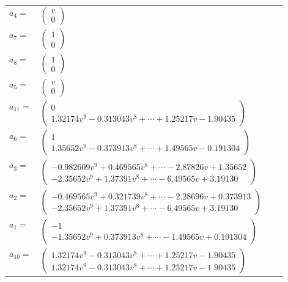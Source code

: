 \documentclass[1p]{elsarticle_modified}
\theoremstyle{definition}
\begin{document}
\begin{tabular}{m{7pt} m{180pt} m{7pt} m{180pt} }
\flushright $a_{4}=$&$\begin{pmatrix}v\\0\end{pmatrix}$ \\
\flushright $a_{7}=$&$\begin{pmatrix}1\\0\end{pmatrix}$ \\
\flushright $a_{8}=$&$\begin{pmatrix}1\\0\end{pmatrix}$ \\
\flushright $a_{5}=$&$\begin{pmatrix}v\\0\end{pmatrix}$ \\
\flushright $a_{11}=$&$\begin{pmatrix}0\\1.32174 v^{9}-0.313043 v^{8}+\cdots+1.25217 v-1.90435\end{pmatrix}$ \\
\flushright $a_{6}=$&$\begin{pmatrix}1\\1.35652 v^{9}-0.373913 v^{8}+\cdots+1.49565 v-0.191304\end{pmatrix}$ \\
\flushright $a_{3}=$&$\begin{pmatrix}-0.982609 v^{9}+0.469565 v^{8}+\cdots-2.87826 v+1.35652\\-2.35652 v^{9}+1.37391 v^{8}+\cdots-6.49565 v+3.19130\end{pmatrix}$ \\
\flushright $a_{2}=$&$\begin{pmatrix}-0.469565 v^{9}+0.321739 v^{8}+\cdots-2.28696 v+0.373913\\-2.35652 v^{9}+1.37391 v^{8}+\cdots-6.49565 v+3.19130\end{pmatrix}$ \\
\flushright $a_{1}=$&$\begin{pmatrix}-1\\-1.35652 v^{9}+0.373913 v^{8}+\cdots-1.49565 v+0.191304\end{pmatrix}$ \\
\flushright $a_{10}=$&$\begin{pmatrix}1.32174 v^{9}-0.313043 v^{8}+\cdots+1.25217 v-1.90435\\1.32174 v^{9}-0.313043 v^{8}+\cdots+1.25217 v-1.90435\end{pmatrix}$ \\

\end{tabular}
\end{document}
